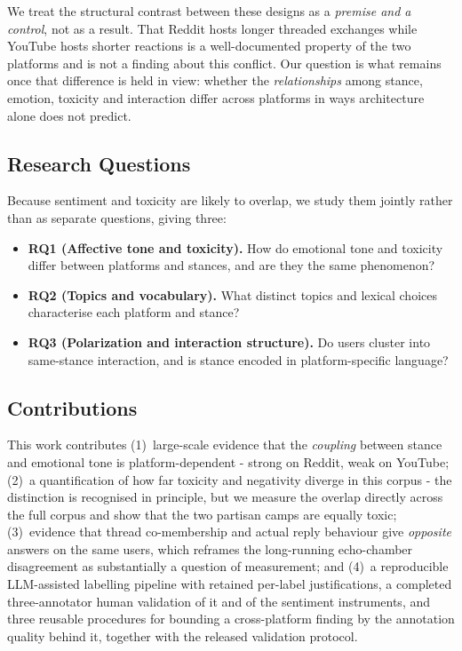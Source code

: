 \documentclass[10pt,twocolumn]{article}
\begin{document}
We treat the structural contrast between these designs as a \emph{premise and a
control}, not as a result. That Reddit hosts longer threaded exchanges while YouTube
hosts shorter reactions is a well-documented property of the two platforms and is
not a finding about this conflict. Our question is what remains once that difference
is held in view: whether the \emph{relationships} among stance, emotion, toxicity and
interaction differ across platforms in ways architecture alone does not predict.

\subsection{Research Questions}
Because sentiment and toxicity are likely to overlap, we study them jointly rather
than as separate questions, giving three:

\begin{itemize}[leftmargin=1.2em,itemsep=1pt,topsep=2pt]
  \item \textbf{RQ1 (Affective tone and toxicity).} How do emotional tone and
  toxicity differ between platforms and stances, and are they the same phenomenon?
  \item \textbf{RQ2 (Topics and vocabulary).} What distinct topics and lexical
  choices characterise each platform and stance?
  \item \textbf{RQ3 (Polarization and interaction structure).} Do users cluster into
  same-stance interaction, and is stance encoded in platform-specific language?
\end{itemize}

\subsection{Contributions}
This work contributes (1)~large-scale evidence that the \emph{coupling} between
stance and emotional tone is platform-dependent - strong on Reddit, weak on
YouTube; (2)~a quantification of how far toxicity and negativity
diverge in this corpus - the distinction is recognised in principle, but we measure
the overlap directly across the full corpus and show that the two partisan camps
are equally toxic; (3)~evidence that thread co-membership and actual reply
behaviour give \emph{opposite} answers on the same users, which reframes the
long-running echo-chamber disagreement as substantially a question of measurement; and (4)~a reproducible LLM-assisted labelling
pipeline with retained per-label justifications, a completed three-annotator human validation of it and of the sentiment instruments, and three reusable procedures for bounding a cross-platform finding by the annotation quality behind it, together with the released validation
protocol.
\end{document}
